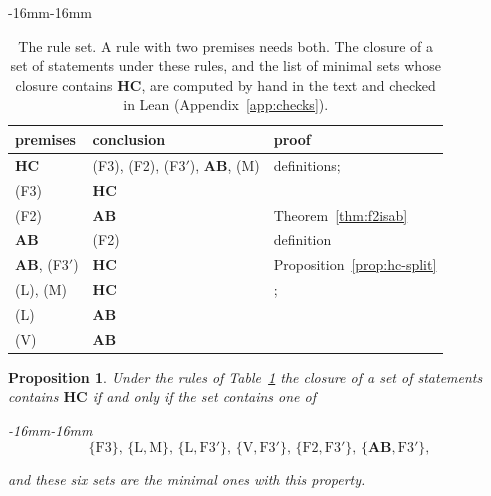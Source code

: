\documentclass[11pt,reqno]{amsart}
\newenvironment{widetext}{\begin{adjustwidth}{-16mm}{-16mm}}{\end{adjustwidth}}
\newenvironment{ruledtabular}{\begin{adjustwidth}{-16mm}{-16mm}\footnotesize\setlength{\tabcolsep}{3.5pt}\centering}{\end{adjustwidth}}
\newcommand{\colrule}{\midrule}
\numberwithin{equation}{section}
\theoremstyle{plain}
\newtheorem{proposition}[theorem]{Proposition}
\theoremstyle{definition}
\newcommand{\HC}{\mathbf{HC}}
\newcommand{\AB}{\mathbf{AB}}
\newcommand{\Fii}{\texorpdfstring{\textup{(F2)}}{(F2)}}
\newcommand{\Fiii}{\texorpdfstring{\textup{(F3$'$)}}{(F3')}}
\begin{document}
\begin{table}[t]
\centering
\caption{The rule set. A rule with two premises needs both. The closure of a set of statements under these rules, and the list of minimal sets whose closure contains $\HC$, are computed by hand in the text and checked in Lean (Appendix~\ref{app:checks}).}
\label{tab:rules}
\begin{ruledtabular}
\begin{tabular}{lll}
premises & conclusion & proof \\
\colrule
$\HC$ & (F3), \Fii{}, \Fiii{}, $\AB$, (M) & definitions; \cite{And96b} \\
(F3) & $\HC$ & \cite[Prop.~20.33]{BMB26} \\
\Fii{} & $\AB$ & Theorem~\ref{thm:f2isab} \\
$\AB$ & \Fii{} & definition \\
$\AB$, \Fiii{} & $\HC$ & Proposition~\ref{prop:hc-split} \\
(L), (M) & $\HC$ & \cite{And96b}; \cite[Thm.~20.70]{BMB26} \\
(L) & $\AB$ & \cite[Thm.~20.70]{BMB26} \\
(V) & $\AB$ & \cite[Thm.~20.70]{BMB26} \\
\end{tabular}
\end{ruledtabular}
\end{table}

\begin{proposition}\label{prop:minimal}
Under the rules of Table~\ref{tab:rules} the closure of a set of statements contains $\HC$ if and only if the set contains one of
\begin{widetext}
\begin{equation}\label{eq:minimal}
\{\mathrm{F3}\},\,\{\mathrm{L},\mathrm{M}\},\,\{\mathrm{L},\mathrm{F3}'\},\,\{\mathrm{V},\mathrm{F3}'\},\,\{\mathrm{F2},\mathrm{F3}'\},\,\{\AB,\mathrm{F3}'\},
\end{equation}
\end{widetext}
and these six sets are the minimal ones with this property.
\end{proposition}
\end{document}
